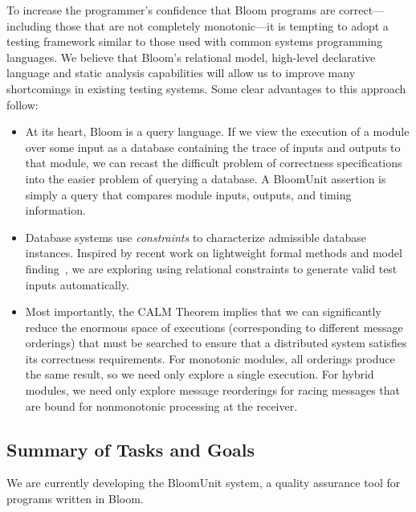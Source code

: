 To increase the programmer's confidence that Bloom programs are correct---including those
that are not completely monotonic---it is tempting to adopt a testing framework similar to those used with common
systems programming languages.   We believe that Bloom's relational model,
high-level declarative language and static analysis capabilities will allow
us to improve many shortcomings in existing testing systems.  Some clear
advantages to this approach follow:

\begin{itemize}
\item At its heart, Bloom is a query language.  If we view the execution
of a module over some input as a database containing the trace of inputs and
outputs to that module, we can recast the difficult problem of correctness 
specifications into the easier problem of querying a database.    A BloomUnit
assertion is simply a query that compares module inputs, outputs, and timing
information.

\item Database systems use \emph{constraints} to characterize admissible 
database instances.  Inspired by recent work on lightweight formal methods and
model finding~\cite{jackson}, we are exploring using relational constraints 
to generate valid test inputs automatically.

\item Most importantly, the CALM Theorem implies that we can significantly
reduce the enormous space of executions (corresponding to different message
orderings) that must be searched to ensure that a distributed system satisfies
its correctness requirements.  For monotonic modules, all orderings produce
the same result, so we need only explore a single execution.  For hybrid
modules, we need only explore message reorderings for racing messages that
are bound for nonmonotonic processing at the receiver.

\end{itemize}



\subsection{Summary of Tasks and Goals}

We are currently developing the BloomUnit system, a quality assurance tool
for programs written in Bloom.  

